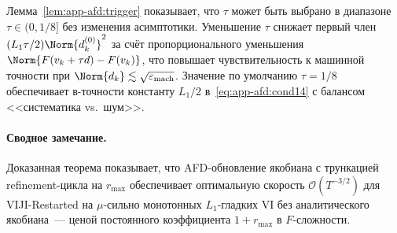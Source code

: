 \begin{remark}
\label{rem:app-afd:tau-sens}
Лемма~\ref{lem:app-afd:trigger} показывает, что $\tau$ может быть
выбрано в диапазоне $\tau \in (0, 1/8]$ без изменения асимптотики.
Уменьшение $\tau$ снижает первый член $(L_1\tau/2)\Norm{d^{(0)}_k}^{2}$
за счёт пропорционального уменьшения $\Norm{F(v_k + \tau d) - F(v_k)}$,
что повышает чувствительность к машинной точности при
$\Norm{d_k} \lesssim \sqrt{\varepsilon_{\mathrm{mach}}}$. Значение по
умолчанию $\tau = 1/8$ обеспечивает в-точности константу $L_1/2$
в~\eqref{eq:app-afd:cond14} с балансом <<систематика vs.\ шум>>.
\end{remark}

\paragraph{Сводное замечание.}
Доказанная теорема показывает, что AFD-обновление якобиана с трункацией
refinement-цикла на $r_{\max}$ обеспечивает оптимальную скорость
$\mathcal O(T^{-3/2})$ для VIJI-Restarted на $\mu$-сильно монотонных
$L_1$-гладких VI без аналитического якобиана~--- ценой постоянного
коэффициента $1+r_{\max}$ в $F$-сложности.
